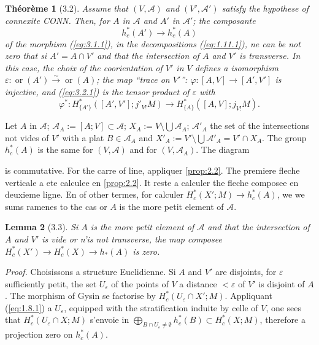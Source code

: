 \documentclass[11pt,a4paper]{article}
\theoremstyle{plain}
\newtheorem{theorem}{Th\'eor\`eme}[section]
\newtheorem{lemma}[theorem]{Lemma}
\theoremstyle{definition}
\newcommand{\ori}{\operatorname{or}}
\begin{document}
\begin{theorem}[3.2]\label{thm:3.2}
Assume that $(V,\mathcal{A})$ and $(V',\mathcal{A}')$ satisfy the hypothese of connexite CONN. Then, for $A$ in $\mathcal{A}$ and $A'$ in $\mathcal{A}'$; the composante
\begin{equation}\label{eq:3.2.1}
h^*_c(A') \longrightarrow h^*_c(A)
\tag{3.2.1}
\end{equation}
of the morphism (\ref{eq:3.1.1}), in the decompositions (\ref{eq:1.11.1}), ne can be not zero that si $A' = A \cap V'$ and that the intersection of $A$ and $V'$ is transverse. In this case, the choix of the coorientation of $V'$ in $V$ defines a isomorphism $\varepsilon: \ori(A') \xrightarrow{\sim} \ori(A)$; the map ``trace on $V'$'': $\varphi: [A,V] \to [A',V']$ is injective, and (\ref{eq:3.2.1}) is the tensor product of $\varepsilon$ with
\begin{equation}\label{eq:3.2.2}
\varphi^*: H^*_{\{A'\}}([A',V'];j'_{V!}M) \longrightarrow H^*_{\{A\}}([A,V];j_{V!}M).
\tag{3.2.2}
\end{equation}
\end{theorem}

Let $A$ in $\mathcal{A}$; $\mathcal{A}_A := [A;V] \subset \mathcal{A}$; $X_A := V \setminus \bigcup\mathcal{A}_A$; $\mathcal{A}'_A$ the set of the intersections not vides of $V'$ with a plat $B \in \mathcal{A}_A$ and $X'_A := V' \setminus \bigcup\mathcal{A}'_A = V' \cap X_A$. The group $h^*_c(A)$ is the same for $(V,\mathcal{A})$ and for $(V,\mathcal{A}_A)$. The diagram
is commutative. For the carre of line, appliquer \ref{prop:2.2}. The premiere fleche verticale a ete calculee en \ref{prop:2.2}. It reste a calculer the fleche composee en deuxieme ligne. En of other termes, for calculer $H^*_c(X';M) \to h^*_c(A)$, we we sums ramenes to the cas or $A$ is the more petit element of $\mathcal{A}$.

\begin{lemma}[3.3]\label{lem:3.3}
Si $A$ is the more petit element of $\mathcal{A}$ and that the intersection of $A$ and $V'$ is vide or n'is not transverse, the map composee $H^*_c(X') \to H^*_c(X) \to h_*(A)$ is zero.
\end{lemma}

\noindent\textit{Proof.} Choisissons a structure Euclidienne. Si $A$ and $V'$ are disjoints, for $\varepsilon$ sufficiently petit, the set $U_\varepsilon$ of the points of $V$ a distance $<\varepsilon$ of $V'$ is disjoint of $A$. The morphism of Gysin se factorise by $H^*_c(U_\varepsilon \cap X';M)$. Appliquant (\ref{eq:1.8.1}) a $U_\varepsilon$, equipped with the stratification induite by celle of $V$, one sees that $H^*_c(U_\varepsilon \cap X;M)$ s'envoie in $\bigoplus_{B \cap U_\varepsilon \neq \emptyset} h^*_c(B) \subset H^*_c(X;M)$, therefore a projection zero on $h^*_c(A)$.
\end{document}
